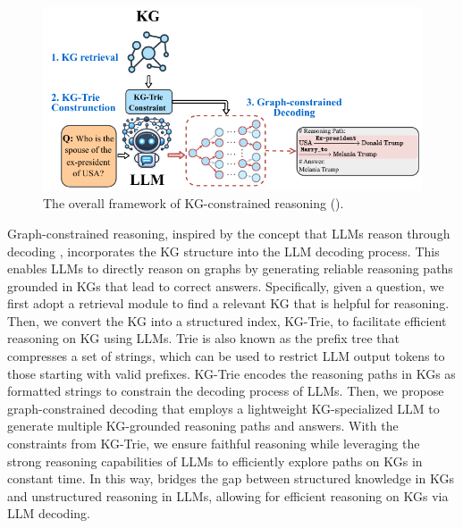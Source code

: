 {\begin{figure}[htbp]
    \begin{center}
    \includegraphics[width=.75\columnwidth]{submissions/CarlYang2024/figures/gcr.pdf}
    \end{center}
    \caption{The overall framework of KG-constrained reasoning (\ourmethod).}
    \label{fig:gcr}
\end{figure}

Graph-constrained reasoning, inspired by the concept that LLMs reason through decoding \citep{wei2022chain}, incorporates the KG structure into the LLM decoding process. This enables LLMs to directly reason on graphs by generating reliable reasoning paths grounded in KGs that lead to correct answers. Specifically, given a question, we first adopt a retrieval module to find a relevant KG that is helpful for reasoning. Then, we convert the KG into a structured index, KG-Trie, to facilitate efficient reasoning on KG using LLMs. Trie is also known as the prefix tree \citep{fredkin1960trie} that compresses a set of strings, which can be used to restrict LLM output tokens to those starting with valid prefixes. KG-Trie encodes the reasoning paths in KGs as formatted strings to constrain the decoding process of LLMs. Then, we propose graph-constrained decoding that employs a lightweight KG-specialized LLM to generate multiple KG-grounded reasoning paths and answers. With the constraints from KG-Trie, we ensure faithful reasoning while leveraging the strong reasoning capabilities of LLMs to efficiently explore paths on KGs in constant time. In this way, \ourmethod bridges the gap between structured knowledge in KGs and unstructured reasoning in LLMs, allowing for efficient reasoning on KGs via LLM decoding.

}
